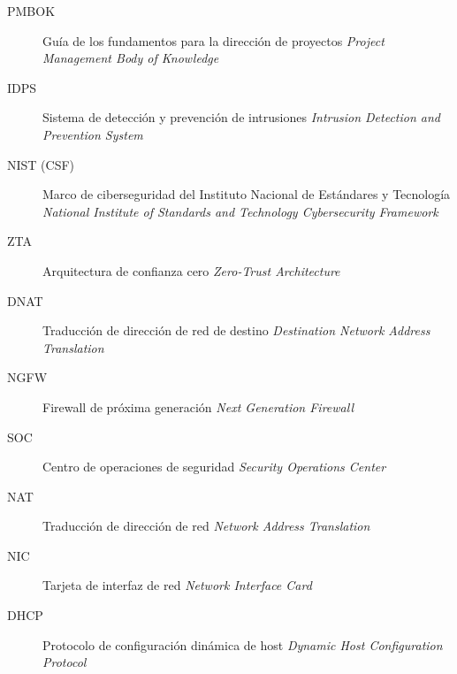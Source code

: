 \begin{description}
	\item[PMBOK] Guía de los fundamentos para la dirección de proyectos \textit{Project Management Body of Knowledge}
	\item[IDPS] Sistema de detección y prevención de intrusiones \textit{Intrusion Detection and Prevention System}
	\item[NIST (CSF)] Marco de ciberseguridad del Instituto Nacional de Estándares y Tecnología \textit{National Institute of Standards and Technology Cybersecurity Framework}
	\item[ZTA] Arquitectura de confianza cero \textit{Zero-Trust Architecture}
	\item[DNAT] Traducción de dirección de red de destino \textit{Destination Network Address Translation}
	\item[NGFW] Firewall de próxima generación \textit{Next Generation Firewall}
	\item[SOC] Centro de operaciones de seguridad \textit{Security Operations Center}
	\item[NAT] Traducción de dirección de red \textit{Network Address Translation}
	\item[NIC] Tarjeta de interfaz de red \textit{Network Interface Card}
	\item[DHCP] Protocolo de configuración dinámica de host \textit{Dynamic Host Configuration Protocol}
\end{description}
